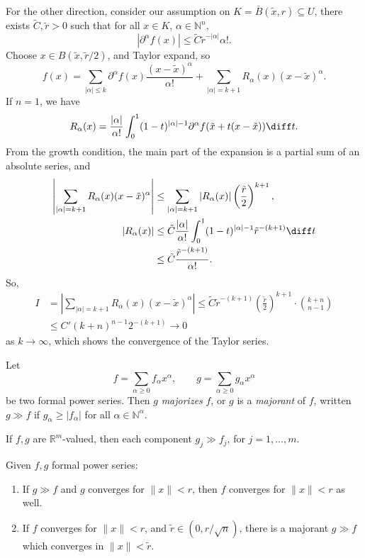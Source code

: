 \documentclass[12pt]{article}
\begin{document}
\begin{proofbox}
	For the other direction, consider our assumption on $K = \bar B(\tilde x, r) \subseteq U$, there exists $\tilde C, \tilde r > 0$ such that for all $x \in K$, $\alpha \in \mathbb{N}^n$,
	\[
	|\partial^\alpha f(x)| \leq \tilde C \tilde r^{-|\alpha|} \alpha!.
	\]
	Choose $x \in B(\tilde x, \tilde r/2)$, and Taylor expand, so
	\[
	f(x) = \sum_{|\alpha| \leq k} \partial^\alpha f(x) \frac{(x - \tilde x)^\alpha}{\alpha!} + \sum_{|\alpha| = k + 1} R_\alpha(x) (x - \tilde x)^\alpha.
	\]
	If $n = 1$, we have
	\[
	R_\alpha(x) = \frac{|\alpha|}{\alpha!} \int_0^1 (1 - t)^{|\alpha| - 1} \partial^\alpha f( \tilde x + t (x - \tilde x)) \diff t.
	\]
	From the growth condition, the main part of the expansion is a partial sum of an absolute series, and
	\begin{align*}
		\left| \sum_{|\alpha| = k + 1} R_\alpha(x) (x - \tilde x)^\alpha \right| &\leq \sum_{|\alpha| = k+1} |R_\alpha(x)| \left( \frac{\tilde r}{2} \right)^{k + 1}, \\
											|R_\alpha(x)| &\leq \tilde C \frac{|\alpha|}{\alpha!} \int_0^1 (1-t)^{|\alpha|-1} \tilde r^{-(k+1)} \diff t \\
												      &\leq \tilde C \frac{\tilde r^{-(k+1)}}{\alpha!}.
	\end{align*}
	So,
	\begin{align*}
		I &= \left| \sum_{|\alpha| = k + 1} R_\alpha(x) (x - \tilde x)^\alpha \right| \leq \tilde C \tilde r^{-(k+1)} \left( \frac{\tilde r}{2} \right)^{k+1} \cdot \binom{k+n}{n-1} \\
		  &\leq C' (k + n)^{n-1} 2^{-(k+1)} \to 0
	\end{align*}
	as $k \to \infty$, which shows the convergence of the Taylor series.
\end{proofbox}

\begin{definition}
	Let
	\[
	f = \sum_{\alpha \geq 0} f_\alpha x^\alpha, \qquad g = \sum_{\alpha \geq 0} g_\alpha x^\alpha
	\]
	be two formal power series. Then $g$ \emph{majorizes} $f$, or $g$ is a \emph{majorant} of $f$, written $g \gg f$ if $g_\alpha \geq |f_\alpha|$ for all $\alpha \in \mathbb{N}^\alpha$.

	If $f, g$ are $\mathbb{R}^m$-valued, then each component $g_j \gg f_j$, for $j = 1, \ldots, m$.
\end{definition}

\begin{proposition}
	Given $f, g$ formal power series:
	\begin{enumerate}[\normalfont(i)]
		\item If $g \gg f$ and $g$ converges for $\|x\| < r$, then $f$ converges for $\|x\| < r$ as well.
		\item If $f$ converges for $\|x\| < r$, and $\tilde r \in (0, r/\sqrt n)$, there is a majorant $g \gg f$ which converges in $\|x\| < \tilde r$.
	\end{enumerate}
\end{proposition}
\end{document}
